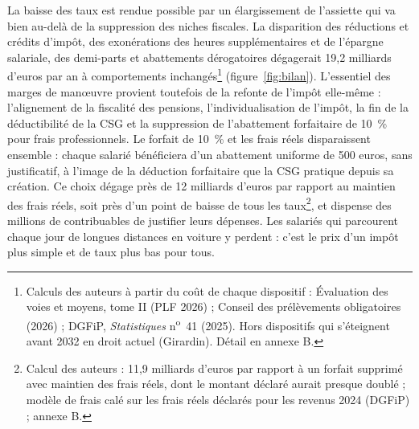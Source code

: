 \documentclass[10pt,a4paper]{article}
\begin{document}
La baisse des taux est rendue possible par un élargissement de l’assiette qui va bien au-delà de la suppression des niches fiscales. La disparition des réductions et crédits d’impôt, des exonérations des heures supplémentaires et de l’épargne salariale, des demi-parts et abattements dérogatoires dégagerait 19,2 milliards d’euros par an à comportements inchangés\footnote{Calculs des auteurs à partir du coût de chaque dispositif : Évaluation des voies et moyens, tome II (PLF 2026) ; Conseil des prélèvements obligatoires (2026) ; DGFiP, \emph{Statistiques} n\textsuperscript{o}~41 (2025). Hors dispositifs qui s'éteignent avant 2032 en droit actuel (Girardin). Détail en annexe B.} (figure~\ref{fig:bilan}). L’essentiel des marges de manœuvre provient toutefois de la refonte de l’impôt elle-même : l’alignement de la fiscalité des pensions, l’individualisation de l’impôt, la fin de la déductibilité de la CSG et la suppression de l’abattement forfaitaire de 10~\% pour frais professionnels. Le forfait de 10~\% et les frais réels disparaissent ensemble : chaque salarié bénéficiera d'un abattement uniforme de 500 euros, sans justificatif, à l'image de la déduction forfaitaire que la CSG pratique depuis sa création. Ce choix dégage près de 12 milliards d'euros par rapport au maintien des frais réels, soit près d'un point de baisse de tous les taux\footnote{Calcul des auteurs : 11,9 milliards d'euros par rapport à un forfait supprimé avec maintien des frais réels, dont le montant déclaré aurait presque doublé ; modèle de frais calé sur les frais réels déclarés pour les revenus 2024 (DGFiP) ; annexe B.}, et dispense des millions de contribuables de justifier leurs dépenses. Les salariés qui parcourent chaque jour de longues distances en voiture y perdent : c'est le prix d'un impôt plus simple et de taux plus bas pour tous.
\end{document}
